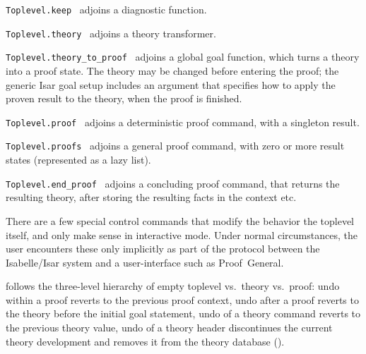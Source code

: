 \begin{isabellebody}
\begin{isamarkuptext}
\begin{description}
  \item \verb|Toplevel.keep|~ adjoins a diagnostic
  function.

  \item \verb|Toplevel.theory|~ adjoins a theory
  transformer.

  \item \verb|Toplevel.theory_to_proof|~ adjoins a global
  goal function, which turns a theory into a proof state.  The theory
  may be changed before entering the proof; the generic Isar goal
  setup includes an argument that specifies how to apply the proven
  result to the theory, when the proof is finished.

  \item \verb|Toplevel.proof|~ adjoins a deterministic
  proof command, with a singleton result.

  \item \verb|Toplevel.proofs|~ adjoins a general proof
  command, with zero or more result states (represented as a lazy
  list).

  \item \verb|Toplevel.end_proof|~ adjoins a concluding
  proof command, that returns the resulting theory, after storing the
  resulting facts in the context etc.

  \end{description}%
\end{isamarkuptext}%
\isamarkuptrue%
%
\endisatagmlref
{\isafoldmlref}%
%
\isadelimmlref
%
\endisadelimmlref
%
\isamarkuptrue%
%
\begin{isamarkuptext}%
There are a few special control commands that modify the behavior
  the toplevel itself, and only make sense in interactive mode.  Under
  normal circumstances, the user encounters these only implicitly as
  part of the protocol between the Isabelle/Isar system and a
  user-interface such as Proof~General.

  \begin{description}

  \item {} follows the three-level hierarchy of empty
  toplevel vs.\ theory vs.\ proof: undo within a proof reverts to the
  previous proof context, undo after a proof reverts to the theory
  before the initial goal statement, undo of a theory command reverts
  to the previous theory value, undo of a theory header discontinues
  the current theory development and removes it from the theory
  database ().


\end{description}
\end{isamarkuptext}
\end{isabellebody}
